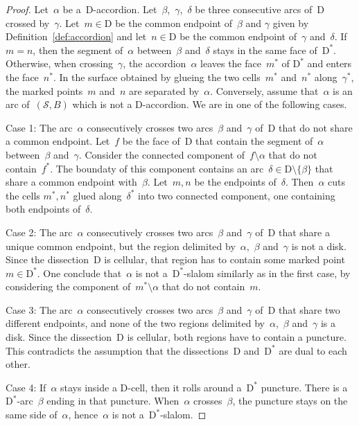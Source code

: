 \documentclass{amsart}
\theoremstyle{definition}
\newcommand{\vincent}[1]{\todo[color=blue!30]{#1 \\ \hfill --- V.}}
\newcommand{\surface}{\mathcal{S}} %
\newcommand{\dual}{^*} %
\newcommand{\dissection}{\mathrm{D}} %
\begin{document}
\begin{proof}
\vincent{Careful: arcs / curves.}
Let~$\alpha$ be a~$\dissection$-accordion.
Let~$\beta$,~$\gamma$,~$\delta$ be three consecutive arcs of~$\dissection$ crossed by~$\gamma$.
Let~$m\in\dissection$ be the common endpoint of~$\beta$ and $\gamma$ given by Definition~\ref{def:accordion} and let~$n\in\dissection$ be the common endpoint of~$\gamma$ and~$\delta$.
If $m=n$, then the segment of~$\alpha$ between~$\beta$ and~$\delta$ stays in the same face of~$\dissection\dual$.
Otherwise, when crossing~$\gamma$, the accordion~$\alpha$ leaves the face~$m\dual$ of $\dissection\dual$ and enters the face~$n\dual$.
In the surface obtained by glueing the two cells~$m\dual$ and~$n\dual$ along~$\gamma\dual$, the marked points~$m$ and~$n$ are separated by~$\alpha$.
Conversely, assume that~$\alpha$ is an arc of~$(\surface, B)$ which is not a $\dissection$-accordion.
We are in one of the following cases.

Case 1: The arc~$\alpha$ consecutively crosses two arcs~$\beta$ and~$\gamma$ of~$\dissection$ that do not share a common endpoint.
Let~$f$ be the face of~$\dissection$ that contain the segment of~$\alpha$ between~$\beta$ and~$\gamma$.
Consider the connected component of~$f\setminus\alpha$ that do not contain~$f\dual$.
The boundaty of this component contains an arc~$\delta\in\dissection\setminus\{\beta\}$ that share a common endpoint with~$\beta$.
Let~$m,n$ be the endpoints of~$\delta$.
Then~$\alpha$ cuts the cells $m\dual,n\dual$ glued along~$\delta\dual$ into two connected component, one containing both endpoints of~$\delta$.

Case 2: The arc~$\alpha$ consecutively crosses two arcs~$\beta$ and~$\gamma$ of~$\dissection$ that share a unique common endpoint, but the region delimited by~$\alpha$,~$\beta$ and~$\gamma$ is not a disk.
Since the dissection~$\dissection$ is cellular, that region has to contain some marked point~$m\in\dissection\dual$.
One conclude that~$\alpha$ is not a~$\dissection\dual$-slalom similarly as in the first case, by considering the component of~$m\dual\setminus\alpha$ that do not contain~$m$.

Case 3: The arc~$\alpha$ consecutively crosses two arcs~$\beta$ and~$\gamma$ of~$\dissection$ that share two different endpoints, and none of the two regions delimited by~$\alpha$,~$\beta$ and~$\gamma$ is a disk.
Since the dissection~$\dissection$ is cellular, both regions have to contain a puncture.
This contradicts the assumption that the dissections~$\dissection$ and~$\dissection\dual$ are dual to each other.

Case 4: If~$\alpha$ stays inside a $\dissection$-cell, then it rolls around a~$\dissection\dual$ puncture.
There is a~$\dissection\dual$-arc~$\beta$ ending in that puncture. When~$\alpha$ crosses~$\beta$, the puncture stays on the same side of~$\alpha$, hence~$\alpha$ is not a~$\dissection\dual$-slalom.
\end{proof}
\end{document}

